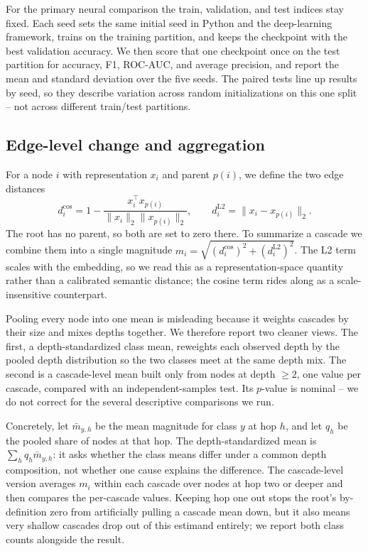 \documentclass[conference]{IEEEtran}
\begin{document}
For the primary neural comparison the train, validation, and test indices stay
fixed. Each seed sets the same initial seed in Python and the deep-learning
framework, trains on the training partition, and keeps the checkpoint with the
best validation accuracy. We then score that one checkpoint once on the test
partition for accuracy, F1, ROC-AUC, and average precision, and report the mean
and standard deviation over the five seeds. The paired tests line up results by
seed, so they describe variation across random initializations on this one
split -- not across different train/test partitions.

\subsection{Edge-level change and aggregation}
For a node $i$ with representation $x_i$ and parent $p(i)$, we define the two
edge distances
\begin{equation}
 d_i^{\mathrm{cos}}=1-\frac{x_i^\top x_{p(i)}}
 {\|x_i\|_2\|x_{p(i)}\|_2},\qquad
 d_i^{\mathrm{L2}}=\|x_i-x_{p(i)}\|_2 .
 \label{eq:drift}
\end{equation}
The root has no parent, so both are set to zero there. To summarize a cascade
we combine them into a single magnitude
$m_i=\sqrt{(d_i^{\mathrm{cos}})^2+(d_i^{\mathrm{L2}})^2}$. The L2 term scales
with the embedding, so we read this as a representation-space quantity rather
than a calibrated semantic distance; the cosine term rides along as a
scale-insensitive counterpart.

Pooling every node into one mean is misleading because it weights cascades by
their size and mixes depths together. We therefore report two cleaner views.
The first, a depth-standardized class mean, reweights each observed depth by
the pooled depth distribution so the two classes meet at the same depth mix.
The second is a cascade-level mean built only from nodes at depth $\geq2$, one
value per cascade, compared with an independent-samples test. Its $p$-value is
nominal -- we do not correct for the several descriptive comparisons we run.

Concretely, let $\bar m_{y,h}$ be the mean magnitude for class $y$ at hop
$h$, and let $q_h$ be the pooled share of nodes at that hop. The
depth-standardized mean is $\sum_h q_h\bar m_{y,h}$: it asks whether the class
means differ under a common depth composition, not whether one cause explains
the difference. The cascade-level version averages $m_i$ within each cascade
over nodes at hop two or deeper and then compares the per-cascade values.
Keeping hop one out stops the root's by-definition zero from artificially
pulling a cascade mean down, but it also means very shallow cascades drop out
of this estimand entirely; we report both class counts alongside the result.
\end{document}
